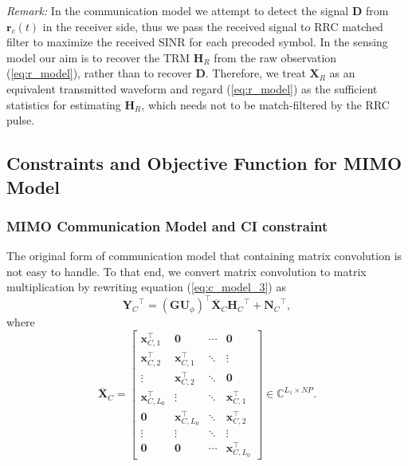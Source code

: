 \documentclass[lettersize,journal]{IEEEtran}
\begin{document}
\textit{Remark:} In the communication model we attempt to detect the signal $\mathbf{D}$ from $\mathbf{r}_c(t)$ in the receiver side, thus we pass the received signal to RRC matched filter to maximize the received SINR for each precoded symbol. In the sensing model our aim is to recover the TRM $\mathbf{H}_R$ from the raw observation (\ref{eq:r_model}), rather than to recover $\mathbf{D}$. Therefore, we treat $\mathbf{X}_R$ as an equivalent transmitted waveform and regard (\ref{eq:r_model}) as the sufficient statistics for estimating $\mathbf{H}_R$, which needs not to be match-filtered by the RRC pulse.


\subsection{Constraints and Objective Function for MIMO Model}
\subsubsection{MIMO Communication Model and CI constraint}
The original form of communication model that containing matrix convolution is not easy to handle. To that end, we convert matrix convolution to matrix multiplication by rewriting equation (\ref{eq:c_model_3}) as
\begin{equation}
\label{eq:c_model_4}
    {\mathbf{Y}_C}^{\top} = (\mathbf{G}\mathbf{U}_{\phi})^{\top}\overline{\mathbf{X}}_C{\mathbf{H}_C}^{\top} + {\mathbf{N}_C}^{\top},
\end{equation}
where
\begin{equation}
\label{eq:c_def_X}
    \overline{\mathbf{X}}_C = 
    \begin{bmatrix}
        \mathbf{x}_{C,1}^{\top} & \mathbf{0} & \cdots & \mathbf{0} \\
        \mathbf{x}_{C,2}^{\top} & \mathbf{x}_{C,1}^{\top} & \ddots & \vdots \\
        \vdots & \mathbf{x}_{C,2}^{\top} & \ddots & \mathbf{0} \\
        \mathbf{x}_{C,L_0}^{\top} & \vdots & \ddots & \mathbf{x}_{C,1}^{\top} \\
        \mathbf{0} & \mathbf{x}_{C,L_0}^{\top} & \ddots & \mathbf{x}_{C,2}^{\top} \\
        \vdots & \vdots & \ddots & \vdots \\
        \mathbf{0} & \mathbf{0} & \cdots & \mathbf{x}_{C,L_0}^{\top}
    \end{bmatrix}\in\mathbb{C}^{L_1\times NP}.
\end{equation}
\end{document}
